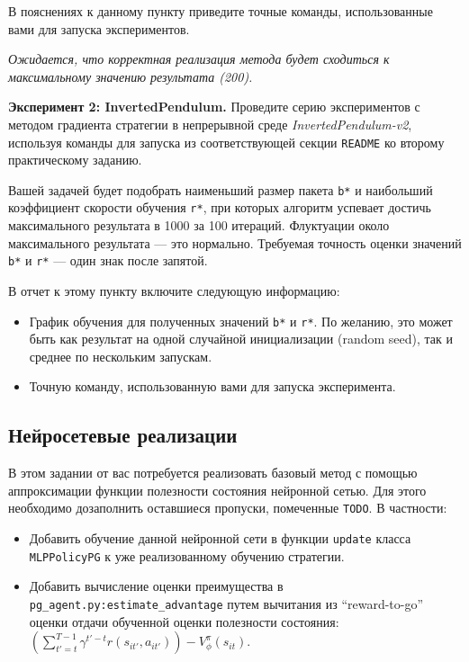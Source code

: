 \documentclass[12pt, oneside]{article}
\begin{document}
В пояснениях к данному пункту приведите точные команды, использованные вами для запуска экспериментов.

\textit{Ожидается, что корректная реализация метода будет сходиться к максимальному значению результата (200).}

\textbf{Эксперимент 2: InvertedPendulum.} Проведите серию экспериментов с методом градиента стратегии в непрерывной среде \textit{InvertedPendulum-v2}, используя команды для запуска из соответствующей секции \verb|README| ко второму практическому заданию.

Вашей задачей будет подобрать наименьший размер пакета \verb|b*| и наибольший коэффициент скорости обучения \verb|r*|, при которых алгоритм успевает достичь максимального результата в 1000 за 100 итераций. Флуктуации около максимального результата --- это нормально. Требуемая точность оценки значений \verb|b*| и \verb|r*| --- один знак после запятой.

В отчет к этому пункту включите следующую информацию:

\begin{itemize}
    \item График обучения для полученных значений \verb|b*| и \verb|r*|. По желанию, это может быть как результат на одной случайной инициализации (random seed), так и среднее по нескольким запускам.
    \item Точную команду, использованную вами для запуска эксперимента.
\end{itemize}

\subsection{Нейросетевые реализации}

В этом задании от вас потребуется реализовать базовый метод с помощью аппроксимации функции полезности состояния нейронной сетью. Для этого необходимо дозаполнить оставшиеся пропуски, помеченные \verb|TODO|. В частности:

\begin{itemize}
    \item Добавить обучение данной нейронной сети в функции \verb|update| класса \verb|MLPPolicyPG| к уже реализованному обучению стратегии.
    \item Добавить вычисление оценки преимущества в \verb|pg_agent.py:estimate_advantage| путем вычитания из ``reward-to-go'' оценки отдачи обученной оценки полезности состояния: $\left( \sum_{t' = t}^{T - 1} {\gamma^{t'-t} r(s_{it'}, a_{it'})} \right) - V_\phi^\pi (s_{it})$.
\end{itemize}
\end{document}
